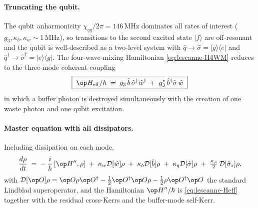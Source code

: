 \paragraph{Truncating the qubit.}
The qubit anharmonicity $\chi_{qq}/2\pi=146$\,MHz dominates all rates
of interest ($g_3,\kappa_b,\kappa_w\sim 1$\,MHz), so transitions to
the second excited state $|f\rangle$ are off-resonant and the qubit
is well-described as a two-level system with
$\hat q\to\hat\sigma=|g\rangle\langle e|$ and
$\hat q^\dagger\to\hat\sigma^\dagger=|e\rangle\langle g|$. The
four-wave-mixing Hamiltonian \cref{eq:lescanne-H4WM} reduces to
the three-mode coherent coupling
\begin{equation}
\label{eq:lescanne-Heff}
\boxed{\;\op H_{\rm eff}/\hbar
\;=\; g_3\,\hat b\,\hat\sigma^\dagger\hat w^\dagger
\;+\; g_3^*\,\hat b^\dagger\hat\sigma\,\hat w\;}
\end{equation}
in which a buffer photon is destroyed simultaneously with the
creation of one waste photon and one qubit excitation.

\paragraph{Master equation with all dissipators.}
Including dissipation on each mode,
\begin{equation}
\label{eq:lescanne-master}
\frac{d\rho}{dt}
\;=\; -\,\frac{i}{\hbar}\,[\op H'',\rho]
\;+\; \kappa_w\mathcal D[\hat w]\rho
\;+\; \kappa_b\mathcal D[\hat b]\rho
\;+\; \kappa_q\mathcal D[\hat\sigma]\rho
\;+\; \tfrac{\kappa_\varphi}{2}\,\mathcal D[\hat\sigma_z]\rho,
\end{equation}
with $\mathcal D[\op O]\rho=\op O\rho\op O^\dagger
-\tfrac{1}{2}\op O^\dagger\op O\rho-\tfrac{1}{2}\rho\op O^\dagger\op O$
the standard Lindblad superoperator, and the Hamiltonian
$\op H''/\hbar$ is \cref{eq:lescanne-Heff} together with the
residual cross-Kerrs and the buffer-mode self-Kerr.

